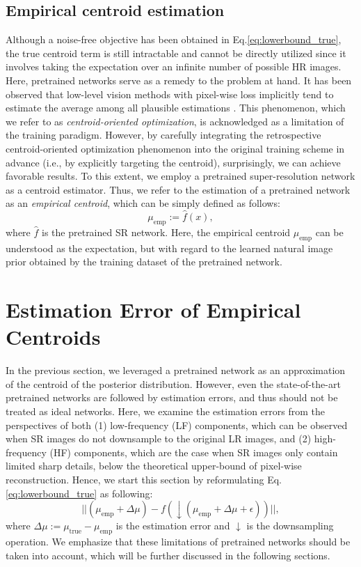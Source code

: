\documentclass[letterpaper]{article} %
\begin{document}
\subsection{Empirical centroid estimation}
Although a noise-free objective has been obtained in Eq.\eqref{eq:lowerbound_true}, the true centroid term is still intractable and cannot be directly utilized since it involves taking the expectation over an infinite number of possible HR images.
%
Here, pretrained networks serve as a remedy to the problem at hand. It has been observed that low-level vision methods with pixel-wise loss implicitly tend to estimate the average among all plausible estimations \cite{coo_1, coo_2, SISR6_SRGAN, SISR7_ESRGAN} . This phenomenon, which we refer to as \textit{centroid-oriented optimization}, is acknowledged as a limitation of the training paradigm. 
%
However, by carefully integrating the retrospective centroid-oriented optimization phenomenon into the original training scheme in advance (i.e., by explicitly targeting the centroid), surprisingly, we can achieve favorable results. 
%
To this extent, we employ a pretrained super-resolution network as a centroid estimator. Thus, we refer to the estimation of a pretrained network as an \textit{empirical centroid}, which can be simply defined as follows:
%
\begin{equation}
    \mu_{\text{emp}} := \hat{f}(x),
\end{equation}
%
where $\hat{f}$ is the pretrained SR network. 
%
Here, the empirical centroid $\mu_{\text{emp}}$ can be understood as the expectation, but with regard to the learned natural image prior obtained by the training dataset of the pretrained network.





\section{Estimation Error of Empirical Centroids}

In the previous section, we leveraged a pretrained network as an approximation of the centroid of the posterior distribution. However, even the state-of-the-art pretrained networks are followed by estimation errors, and thus should not be treated as ideal networks. 
%
Here, we examine the estimation errors from the perspectives of both (1) low-frequency (LF) components, which can be observed when SR images do not downsample to the original LR images, and (2) high-frequency (HF) components, which are the case when SR images only contain limited sharp details, below the theoretical upper-bound of pixel-wise reconstruction. Hence, we start this section by reformulating Eq.\eqref{eq:lowerbound_true} as following:
%
\begin{equation}
    \label{eq:lowerbound_with_estimationerror}
    ||(\mu_{\text{emp}} + \Delta\mu) - f(\downarrow(\mu_{\text{emp}} + \Delta\mu + \epsilon))||,
\end{equation}
%
where $\Delta\mu:=\mu_{\text{true}}-\mu_{\text{emp}}$ is the estimation error and $\downarrow$ is the downsampling operation.
We emphasize that these limitations of pretrained networks should be taken into account, which will be further discussed in the following sections.
\end{document}
